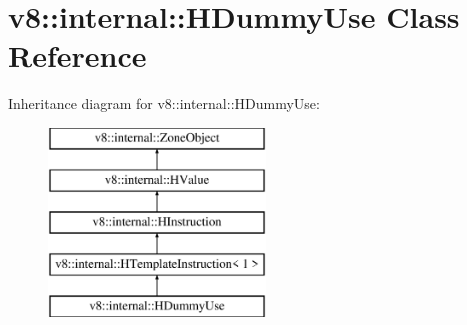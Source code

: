 \hypertarget{classv8_1_1internal_1_1_h_dummy_use}{}\section{v8\+:\+:internal\+:\+:H\+Dummy\+Use Class Reference}
\label{classv8_1_1internal_1_1_h_dummy_use}
Inheritance diagram for v8\+:\+:internal\+:\+:H\+Dummy\+Use\+:\begin{figure}[H]
\begin{center}
\leavevmode
\includegraphics[height=5.000000cm]{classv8_1_1internal_1_1_h_dummy_use}
\end{center}
\end{figure}
